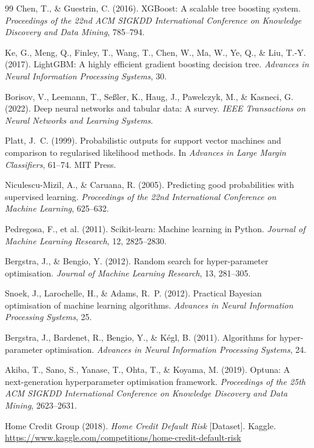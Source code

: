 \documentclass[12pt, a4paper]{article}
\begin{document}
\begin{thebibliography}{99}
Chen, T., \& Guestrin, C. (2016).
XGBoost: A scalable tree boosting system.
\textit{Proceedings of the 22nd ACM SIGKDD International Conference on Knowledge Discovery and Data Mining}, 785--794.

Ke, G., Meng, Q., Finley, T., Wang, T., Chen, W., Ma, W., Ye, Q., \& Liu, T.-Y. (2017).
LightGBM: A highly efficient gradient boosting decision tree.
\textit{Advances in Neural Information Processing Systems}, 30.

Borisov, V., Leemann, T., Se{\ss}ler, K., Haug, J., Pawelczyk, M., \& Kasneci, G. (2022).
Deep neural networks and tabular data: A survey.
\textit{IEEE Transactions on Neural Networks and Learning Systems}.

Platt, J.~C. (1999).
Probabilistic outputs for support vector machines and comparison to regularised likelihood methods.
In \textit{Advances in Large Margin Classifiers}, 61--74. MIT Press.

Niculescu-Mizil, A., \& Caruana, R. (2005).
Predicting good probabilities with supervised learning.
\textit{Proceedings of the 22nd International Conference on Machine Learning}, 625--632.

Pedregosa, F., et al. (2011).
Scikit-learn: Machine learning in Python.
\textit{Journal of Machine Learning Research}, 12, 2825--2830.

Bergstra, J., \& Bengio, Y. (2012).
Random search for hyper-parameter optimisation.
\textit{Journal of Machine Learning Research}, 13, 281--305.

Snoek, J., Larochelle, H., \& Adams, R.~P. (2012).
Practical Bayesian optimisation of machine learning algorithms.
\textit{Advances in Neural Information Processing Systems}, 25.

Bergstra, J., Bardenet, R., Bengio, Y., \& K{\'e}gl, B. (2011).
Algorithms for hyper-parameter optimisation.
\textit{Advances in Neural Information Processing Systems}, 24.

Akiba, T., Sano, S., Yanase, T., Ohta, T., \& Koyama, M. (2019).
Optuna: A next-generation hyperparameter optimisation framework.
\textit{Proceedings of the 25th ACM SIGKDD International Conference on Knowledge Discovery and Data Mining}, 2623--2631.

Home Credit Group (2018).
\textit{Home Credit Default Risk} [Dataset].
Kaggle. \url{https://www.kaggle.com/competitions/home-credit-default-risk}


\end{thebibliography}
\end{document}
